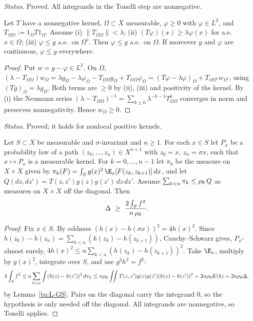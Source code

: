 \noindent\emph{Status.} Proved. All integrands in the Tonelli step are nonnegative.

\begin{lemma}[Comparison]\label{tu:L-C}
Let $T$ have a nonnegative kernel, $\Omega\subset X$ measurable, $\varphi\ge0$ with $\varphi\in L^2$, and
$T_{\Omega\Omega}:=1_\Omega T1_\Omega$. Assume
(i) $\|T_{\Omega\Omega}\|<\lambda$; (ii) $(T\varphi)(x)\ge\lambda\varphi(x)$ for a.e.\ $x\in\Omega$;
(iii) $\varphi\le g$ a.e.\ on $\Omega^c$. Then $\varphi\le g$ a.e.\ on $\Omega$. If moreover $g$ and
$\varphi$ are continuous, $\varphi\le g$ everywhere.
\end{lemma}

\begin{proof}
Put $w=g-\varphi\in L^2$. On $\Omega$,
$(\lambda-T_{\Omega\Omega})w_\Omega=\lambda g_\Omega-\lambda\varphi_\Omega-T_{\Omega\Omega}g_\Omega+T_{\Omega\Omega}\varphi_\Omega
=(T\varphi-\lambda\varphi)_\Omega+T_{\Omega\Omega^c}w_{\Omega^c}$, using $(Tg)_\Omega=\lambda g_\Omega$.
Both terms are $\ge0$ by (ii), (iii) and positivity of the kernel. By (i) the Neumann series
$(\lambda-T_{\Omega\Omega})^{-1}=\sum_{k\ge0}\lambda^{-k-1}T_{\Omega\Omega}^k$ converges in norm and
preserves nonnegativity. Hence $w_\Omega\ge0$.
\end{proof}

\noindent\emph{Status.} Proved; it holds for nonlocal positive kernels.

\begin{lemma}\label{tu:L-Pc}
Let $S\subset X$ be measurable and $\sigma$-invariant and $n\ge1$. For each $x\in S$ let $P_x$ be a
probability law of a path $(z_0,\dots,z_n)\in X^{n+1}$ with $z_0=x$, $z_n=\sigma x$, such that
$x\mapsto P_x$ is a measurable kernel. For $k=0,\dots,n-1$ let $\pi_k$ be the measure on $X\times X$
given by $\pi_k(F)=\int_S g(x)^2\,\E_x[F(z_k,z_{k+1})]\,dx$, and let
$Q(dz,dz')=T(z,z')g(z)g(z')\,dz\,dz'$. Assume $\sum_{k<n}\pi_k\le\rho_{\rm fl}\,Q$ as measures on
$X\times X$ off the diagonal. Then
\[
\Delta\ \ge\ \frac{2\int_S f^2}{n\,\rho_{\rm fl}} .
\]
\end{lemma}

\begin{proof}
Fix $x\in S$. By oddness $(h(x)-h(\sigma x))^2=4h(x)^2$. Since
$h(z_0)-h(z_n)=\sum_{k<n}(h(z_k)-h(z_{k+1}))$, Cauchy--Schwarz gives, $P_x$-almost surely,
$4h(x)^2\le n\sum_{k<n}(h(z_k)-h(z_{k+1}))^2$. Take $\E_x$, multiply by $g(x)^2$, integrate over
$S$, and use $g^2h^2=f^2$:
\[
4\int_S f^2\le n\sum_{k<n}\int (h(z)-h(z'))^2\,d\pi_k\le n\rho_{\rm fl}\iint T(z,z')g(z)g(z')(h(z)-h(z'))^2
=2n\rho_{\rm fl}E(h)=2n\rho_{\rm fl}\Delta,
\]
by Lemma~\ref{tu:L-GS}. Pairs on the diagonal carry the integrand $0$, so the hypothesis is only
needed off the diagonal. All integrands are nonnegative, so Tonelli applies.
\end{proof}

